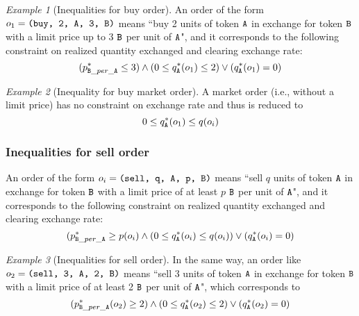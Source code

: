 \documentclass[11pt, reqno]{amsart}
\theoremstyle{definition}
\theoremstyle{remark}
\newtheorem{exmp}{Example}[subsection]
\newcommand{\tA}{\textnormal{\texttt{A}}}
\newcommand{\tB}{\textnormal{\texttt{B}}}
\newcommand{\buy}{\textnormal{\texttt{buy}}}
\newcommand{\sell}{\textnormal{\texttt{sell}}}
\begin{document}
\begin{exmp}[Inequalities for buy order]
An order of the form $o_1 = \texttt{(\buy, 2, \tA, 3, \tB)}$ means
``buy 2 units of token $\tA$ in exchange for token $\tB$ with a limit price up
to 3 $\tB$ per unit of $\tA$",
and it corresponds to the following constraint on realized quantity exchanged
and clearing exchange rate:
\begin{equation*}
    (p_{\tB\_per\_\tA}^* \leq 3) \land
    (0 \le q_\tA^*(o_1) \leq 2) \lor
    (q_\tA^*(o_1) = 0)
\end{equation*}
\end{exmp}

\begin{exmp}[Inequality for buy market order]
A market order (i.e., without a limit price) has no constraint on exchange rate
and thus is reduced to
\[
    0 \le q_\tA^*(o_1) \le q(o_i)
\]
\end{exmp}

\subsubsection{Inequalities for sell order}
An order of the form $o_i = \texttt{(\sell, q, \tA, p, \tB)}$ means
``sell $q$ units of token $\tA$ in exchange for token $\tB$ with a limit price
of at least $p$ $\tB$ per unit of $\tA$",
and it corresponds to the following constraint on realized quantity exchanged
and clearing exchange rate:
\begin{equation*}
    (p_{\tB\_per\_\tA}^* \geq p(o_i) \land
    (0 \le q_\tA^*(o_i) \leq q(o_i)) \lor
    (q_\tA^*(o_i) = 0)
\end{equation*}

\begin{exmp}[Inequalities for sell order]
In the same way, an order like $o_2 = \texttt{(sell, 3, \tA, 2, \tB)}$ means
``sell 3 units of token $\tA$ in exchange for token $\tB$ with a limit price of
at least 2 $\tB$ per unit of $\tA$", which corresponds to
\begin{equation*}
    (p_{\tB\_per\_\tA}^*(o_2) \geq 2) \land
    (0 \le q_\tA^*(o_2) \leq 2) \lor
    (q_\tA^*(o_2) = 0)
\end{equation*}
\end{exmp}
\end{document}
